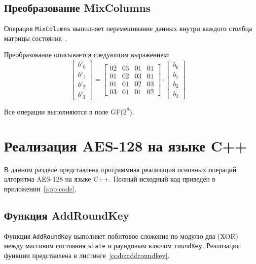 \documentclass[coursework]{SCWorks}
\begin{document}
\subsection{Преобразование MixColumns}

Операция \texttt{MixColumns} выполняет перемешивание данных внутри каждого
столбца матрицы состояния~\cite{daemen2002}.

Преобразование описывается следующим выражением:
\begin{equation}
\begin{bmatrix}
    b'_0 \\
    b'_1 \\
    b'_2 \\
    b'_3
\end{bmatrix}
=
\begin{bmatrix}
    02 & 03 & 01 & 01 \\
    01 & 02 & 03 & 01 \\
    01 & 01 & 02 & 03 \\
    03 & 01 & 01 & 02
\end{bmatrix}
\cdot
\begin{bmatrix}
    b_0 \\
    b_1 \\
    b_2 \\
    b_3
\end{bmatrix}
\label{eq:mixcols}
\end{equation}

Все операции выполняются в поле GF($2^8$).

\section{Реализация AES-128 на языке C++}

В данном разделе представлена программная реализация основных операций
алгоритма AES-128 на языке C++. Полный исходный код приведён в
приложении~\ref{app:code}.

\subsection{Функция AddRoundKey}

Функция \texttt{AddRoundKey} выполняет побитовое сложение по модулю
два (XOR) между массивом состояния \texttt{state} и раундовым ключом
\texttt{roundKey}. Реализация функции представлена в
листинге~\ref{code:addroundkey}.

\begin{listing}[htbp]
    \caption{Функция \texttt{AddRoundKey}}
    \label{code:addroundkey}
    \inputminted{cpp}{code/add_round_key.cpp}
\end{listing}
\end{document}
